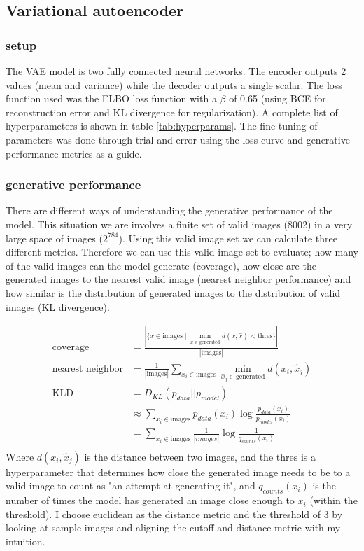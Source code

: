 \documentclass[conference,a4paper]{IEEEtran}
\begin{document}
\subsection{Variational autoencoder}

\subsubsection{setup}

The VAE model is two fully connected neural networks. The encoder outputs 2 values (mean and variance) while the decoder outputs a single scalar. The loss function used was the ELBO loss function with a $\beta$ of 0.65 (using BCE for reconstruction error and KL divergence for regularization). A complete list of hyperparameters is shown in table \ref{tab:hyperparams}. The fine tuning of parameters was done through trial and error using the loss curve and generative performance metrics as a guide.

\subsubsection{generative performance}


There are different ways of understanding the generative performance of the model. This situation we are involves a finite set of valid images (8002) in a very large space of images ($2^{784}$). Using this valid image set we can calculate three different metrics.
Therefore we can use this valid image set to evaluate; how many of the valid images can the model generate (coverage), how close are the generated images to the nearest valid image (nearest neighbor performance) and how similar is the distribution of generated images to the distribution of valid images (KL divergence).

\begin{align*}
\text{coverage} &= \frac{|\{x \in \text{images} \mid \min_{\hat{x} \in \text{generated}} d(x, \hat{x}) < \text{thres}\}|}{|\text{images}|}\\
\text{nearest neighbor} &= \frac{1}{|\text{images}|} \sum_{x_i \in \text{images}} \min_{\hat{x}_j \in \text{generated}} d(x_i, \hat{x}_j)\\
\text{KLD} &= D_{KL}(p_{data} || p_{model})\\
&\approx \sum_{x_i \in \text{images}} p_{data}(x_i) \log \frac{p_{data}(x_i)}{p_{model}(x_i)}\\
&= \sum_{x_i \in \text{images}} \frac{1}{|images|} \log \frac{1}{q_{counts}(x_i)}\\
\end{align*}
Where $d(x_i, \hat{x}_j)$ is the distance between two images, and the $\text{thres}$ is a hyperparameter that determines how close the generated image needs to be to a valid image to count as "an attempt at generating it", and $q_{counts}(x_i)$ is the number of times the model has generated an image close enough to $x_i$ (within the threshold). I choose euclidean as the distance metric and the threshold of 3 by looking at sample images and aligning the cutoff and distance metric with my intuition.
\end{document}
